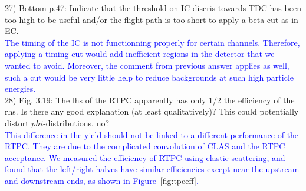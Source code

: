27) Bottom p.47: Indicate that the threshold on IC discris towards TDC has been 
too high to be useful and/or the flight path is too short to apply a beta cut 
as in EC.\\
\textcolor{blue}{
 The timing of the IC is not functionning properly for certain channels. Therefore, 
 applying a timing cut would add inefficient regions in the detector that we 
 wanted to avoid. Moreover, the comment from previous answer applies as well,
such a cut would be very little help to reduce backgrounds at such high particle energies.}\\

28) Fig. 3.19:  The lhs of the RTPC apparently has only 1/2 the efficiency of the 
rhs. Is there any good explanation (at least qualitatively)? This could 
potentially distort $phi$-distributions, no? \\
\textcolor{blue}{ 
   This difference in the yield should not be linked to a different performance 
   of the RTPC.  They are due to the complicated convolution of CLAS and the 
   RTPC acceptance.  We measured the efficiency of RTPC using elastic 
scattering, and found that the left/right halves have similar efficiencies 
except near the upstream and downstream ends, as shown in 
Figure~\ref{fig:tpceff}.} \\

